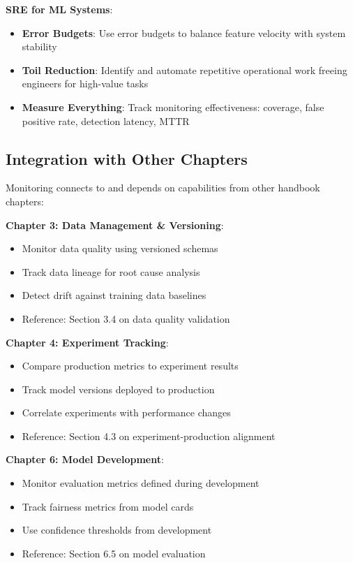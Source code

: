 \textbf{SRE for ML Systems}:
\begin{itemize}
    \item \textbf{Error Budgets}: Use error budgets to balance feature velocity with system stability
    \item \textbf{Toil Reduction}: Identify and automate repetitive operational work freeing engineers for high-value tasks
    \item \textbf{Measure Everything}: Track monitoring effectiveness: coverage, false positive rate, detection latency, MTTR
\end{itemize}

\subsection{Integration with Other Chapters}

Monitoring connects to and depends on capabilities from other handbook chapters:

\textbf{Chapter 3: Data Management \& Versioning}:
\begin{itemize}
    \item Monitor data quality using versioned schemas
    \item Track data lineage for root cause analysis
    \item Detect drift against training data baselines
    \item Reference: Section 3.4 on data quality validation
\end{itemize}

\textbf{Chapter 4: Experiment Tracking}:
\begin{itemize}
    \item Compare production metrics to experiment results
    \item Track model versions deployed to production
    \item Correlate experiments with performance changes
    \item Reference: Section 4.3 on experiment-production alignment
\end{itemize}

\textbf{Chapter 6: Model Development}:
\begin{itemize}
    \item Monitor evaluation metrics defined during development
    \item Track fairness metrics from model cards
    \item Use confidence thresholds from development
    \item Reference: Section 6.5 on model evaluation
\end{itemize}

